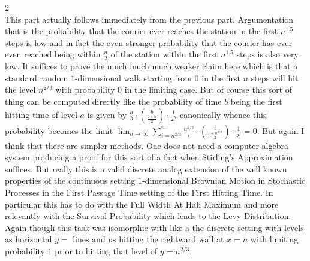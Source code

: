 
2 \\
This part actually follows immediately from the previous part. Argumentation that is the probability that the courier ever reaches the station in the first $n^{1.5}$ steps is low and in fact the even stronger probability that the courier has ever even reached being within $\frac{n}{2}$ of the station within the first $n^{1.5}$ steps is also very low. It suffices to prove the much much much weaker claim here which is that a standard random $1$-dimensional walk starting from $0$ in the first $n$ steps will hit the level $n^{2/3}$ with probability $0$ in the limiting case. But of course this sort of thing can be computed directly like the probability of time $b$ being the first hitting time of level $a$ is given by $\frac{a}{b} \cdot \binom{b}{\frac{b+a}{2}} \cdot \frac{1}{2^n}$ canonically whence this probability becomes the limit $\lim_{n \to \infty} \sum_{i=n^{2/3}}^n \frac{n^{2/3}}{i} \cdot \binom{i}{\frac{i+n^{2/3}}{2}} \cdot \frac{1}{2^i} = 0$. But again I think that there are simpler methods. One does not need a computer algebra system producing a proof for this sort of a fact when Stirling's Approximation suffices. But really this is a valid discrete analog extension of the well known properties of the continuous setting $1$-dimensional Brownian Motion in Stochastic Processes in the First Passage Time setting of the First Hitting Time. In particular this has to do with the Full Width At Half Maximum and more relevantly with the Survival Probability which leads to the Levy Distribution. Again though this task was isomorphic with like a the discrete setting with levels as horizontal $y=$ lines and us hitting the rightward wall at $x=n$ with limiting probability $1$ prior to hitting that level of $y=n^{2/3}$.

